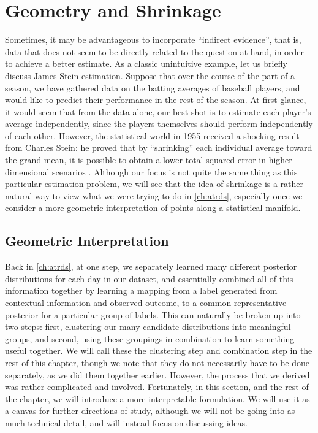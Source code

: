 \chapter{Geometry and Shrinkage}
\label{app:shrinkage}

Sometimes, it may be advantageous to incorporate ``indirect evidence'', that is, data that does not seem to be directly related to the question at hand, in order to achieve a better estimate. As a classic unintuitive example, let us briefly discuss James-Stein estimation. Suppose that over the course of the part of a season, we have gathered data on the batting averages of baseball players, and would like to predict their performance in the rest of the season. At first glance, it would seem that from the data alone, our best shot is to estimate each player's average independently, since the players themselves should perform independently of each other. However, the statistical world in 1955 received a shocking result from Charles Stein: he proved that by ``shrinking'' each individual average toward the grand mean, it is possible to obtain a lower total squared error in higher dimensional scenarios \cite{Stein_1956}. Although our focus is not quite the same thing as this particular estimation problem, we will see that the idea of shrinkage is a rather natural way to view what we were trying to do in \cref{ch:atrds}, especially once we consider a more geometric interpretation of points along a statistical manifold.

\section{Geometric Interpretation}

Back in \cref{ch:atrds}, at one step, we separately learned many different posterior distributions for each day in our dataset, and essentially combined all of this information together by learning a mapping from a label generated from contextual information and observed outcome, to a common representative posterior for a particular group of labels. This can naturally be broken up into two steps: first, clustering our many candidate distributions into meaningful groups, and second, using these groupings in combination to learn something useful together. We will call these the clustering step and combination step in the rest of this chapter, though we note that they do not necessarily have to be done separately, as we did them together earlier. However, the process that we derived was rather complicated and involved. Fortunately, in this section, and the rest of the chapter, we will introduce a more interpretable formulation. We will use it as a canvas for further directions of study, although we will not be going into as much technical detail, and will instead focus on discussing ideas.

